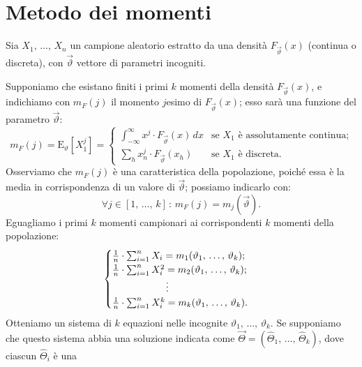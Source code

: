     \section{Metodo dei momenti}
        \begin{defn}
            Sia $X_1,\, \ldots,\, X_{n}$ un campione aleatorio estratto da una densità $F_{\vec{\vartheta}}(x)$ 
            (continua o discreta), con $\vec{\vartheta}$ vettore di parametri incogniti.

            Supponiamo che esistano finiti i primi $k$ momenti della densità $F_{\vec{\vartheta}}(x)$, e 
            indichiamo con $m_F(j)$ il momento $j$\nbdash esimo di $F_{\vec{\vartheta}}(x)$; esso 
            sarà una funzione del parametro $\vec{\vartheta}$: \[
                m_F(j) = \text{E}_{\vartheta}[X_1^{j}] = \begin{cases}
                    \int_{-\infty}^{\infty} x^j\cdot F_{\vec{\vartheta}}(x)\, dx & \text{se $X_1$ è assolutamente continua;} \\
                    \sum_{h} x_n^j\cdot F_{\vec{\vartheta}}(x_h) & \text{se $X_1$ è discreta.}
                \end{cases}
            \] Osserviamo che $m_F(j)$ è una caratteristica della popolazione, poiché essa è la media 
            in corrispondenza di un valore di $\vec{\vartheta}$; possiamo indicarlo con: \[
                \forall j \in [1,\, \ldots,\, k] \,:\, m_F(j) = m_j(\vec{\vartheta})
            .\] Eguagliamo i primi $k$ momenti campionari ai corrispondenti $k$ momenti della popolazione:
            \begin{equation*}
                \begin{cases}
                    \frac{1}{n} \cdot \sum_{i=1}^{n} X_i = m_1(\vartheta_1,\, \ldots,\, \vartheta_k); \\
                    \frac{1}{n} \cdot \sum_{i=1}^{n} X_i^2 = m_2(\vartheta_1,\, \ldots,\, \vartheta_k); \\
                    \hspace{5.5em}\vdots \\
                    \frac{1}{n} \cdot \sum_{i=1}^{n} X_i^k = m_k(\vartheta_1,\, \ldots,\, \vartheta_k).
                \end{cases}
            \end{equation*}
            Otteniamo un sistema di $k$ equazioni nelle incognite $\vartheta_1,\, \ldots,\, \vartheta_k$. Se 
            supponiamo che questo sistema abbia una soluzione indicata come 
            $\vec{\Theta} = (\hat{\Theta}_1,\, \ldots,\, \hat{\Theta}_k)$, dove ciascun $\hat{\Theta}_i$ è una 

\end{defn}

